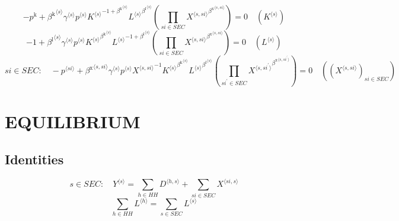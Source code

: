 \begin{equation}
-p^{\mathrm{k}} + {{\beta^{\mathrm{k}}}^{\langle s\rangle}} {{\gamma}^{\langle s\rangle}} {{p}^{\langle s\rangle}} {{{K}^{\langle s\rangle}}^{-1 + {\beta^{\mathrm{k}}}^{\langle s\rangle}}} {{{L}^{\langle s\rangle}}^{{\beta^{\mathrm{l}}}^{\langle s\rangle}}} \left(\prod_{{s\!i}\in {S\!E\!C}} {{X}^{\langle s,{s\!i}\rangle}}^{{\beta^{\mathrm{x}}}^{\langle s,{s\!i}\rangle}}\right) = 0
 \quad \left({K}^{\langle s\rangle}\right)
\end{equation}
\begin{equation}
-1 + {{\beta^{\mathrm{l}}}^{\langle s\rangle}} {{\gamma}^{\langle s\rangle}} {{p}^{\langle s\rangle}} {{{K}^{\langle s\rangle}}^{{\beta^{\mathrm{k}}}^{\langle s\rangle}}} {{{L}^{\langle s\rangle}}^{-1 + {\beta^{\mathrm{l}}}^{\langle s\rangle}}} \left(\prod_{{s\!i}\in {S\!E\!C}} {{X}^{\langle s,{s\!i}\rangle}}^{{\beta^{\mathrm{x}}}^{\langle s,{s\!i}\rangle}}\right) = 0
 \quad \left({L}^{\langle s\rangle}\right)
\end{equation}
\begin{equation}
{s\!i}\in {S\!E\!C}\colon\quad -{p}^{\langle {s\!i}\rangle} + {{\beta^{\mathrm{x}}}^{\langle s,{s\!i}\rangle}} {{\gamma}^{\langle s\rangle}} {{p}^{\langle s\rangle}} {{X}^{\langle s,{s\!i}\rangle}}^{-1} {{{K}^{\langle s\rangle}}^{{\beta^{\mathrm{k}}}^{\langle s\rangle}}} {{{L}^{\langle s\rangle}}^{{\beta^{\mathrm{l}}}^{\langle s\rangle}}} \left(\prod_{{s\!i}^{\prime}\in {S\!E\!C}} {{X}^{\langle s,{s\!i}^{\prime}\rangle}}^{{\beta^{\mathrm{x}}}^{\langle s,{s\!i}^{\prime}\rangle}}\right) = 0
 \quad \left(\left({X}^{\langle s,{s\!i}\rangle}\right)_{{s\!i}\in {S\!E\!C}}\right)
\end{equation}




\section{EQUILIBRIUM}

\subsection{Identities}

\begin{equation}
s\in {S\!E\!C}\colon\quad {Y}^{\langle s\rangle} = \sum_{h\in {H\!H}} {D}^{\langle h,s\rangle} + \sum_{{s\!i}\in {S\!E\!C}} {X}^{\langle {s\!i},s\rangle}
\end{equation}
\begin{equation}
\sum_{h\in {H\!H}} {L}^{\langle h\rangle} = \sum_{s\in {S\!E\!C}} {L}^{\langle s\rangle}
\end{equation}




